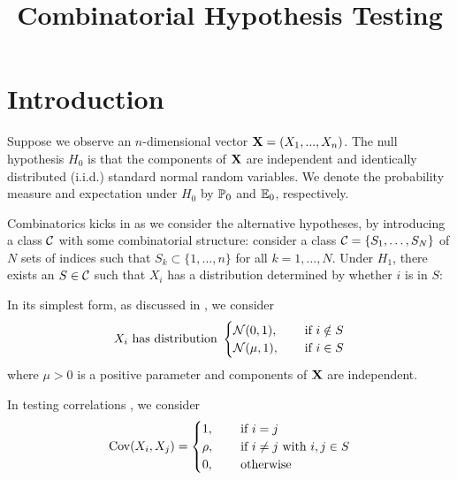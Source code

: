 \documentclass[10pt, oneside]{article}
\begin{document}
\thispagestyle{empty}
\title{Combinatorial Hypothesis Testing}



\maketitle
\addtocounter{footnote}{-1}\let\thefootnote\svthefootnote

\section{Introduction}

Suppose we observe an $n$-dimensional vector $\mathbf{X} = (X_1,...,X_n)$. The null hypothesis $H_0$ is that the components of $\mathbf{X}$ are independent and identically distributed (i.i.d.) standard normal random variables. We denote the probability measure and expectation under $H_0$ by $\mathbb{P}_0$ and $\mathbb{E}_0$, respectively.

Combinatorics kicks in as we consider the alternative hypotheses, by introducing a class ${\mathcal C}$ with some combinatorial structure: consider a class ${\mathcal C}=\{S_1,\ldots,S_N\}$ of $N$ sets of indices such that $S_k \subset\{1,\ldots,n\}$ for all $k=1,\ldots,N$. Under $H_1$, there
exists an $S \in {\mathcal C}$ such that $X_i$ has a distribution determined by whether $i$ is in $S$:
\begin{alt}
  \label{alt:mean}
In its simplest form, as discussed in \cite{arias2008searching, addario2010combinatorial, arias2011detection}, we consider 
$$
X_i \mbox{ has distribution }
\begin{cases}
  {\mathcal N}(0,1), \quad & \mbox{ if }i \notin S\\
  {\mathcal N}(\mu,1), & \mbox{ if }i \in S
\end{cases}
$$
where $\mu>0$ is a positive parameter and components of $\mathbf{X}$ are independent. 
\end{alt}
\begin{alt}
  \label{alt:correlation}
In testing correlations \cite{arias2012correlation}, we consider $$
  \operatorname{Cov}(X_i, X_j) =
  \begin{cases}
    1, \quad & \mbox{ if }i = j\\
    \rho, & \mbox{ if }i \neq j\mbox{ with }i, j \in S\\
    0, & \mbox{ otherwise}\\
  \end{cases}
  $$
\end{alt}
\end{document}
